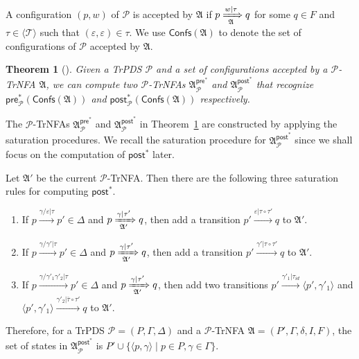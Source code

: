 \documentclass[preprint,12pt]{elsarticle}
\newtheorem{theorem}{Theorem}
\newcommand\Pp{{\mathcal{P} }}
\newcommand\confs{{\mathsf{Confs} }}
\newcommand\pre{{\mathsf{pre} }}
\newcommand\post{{\mathsf{post} }}
\newcommand\Aut{{\mathfrak{A} }}
\newcommand\TranSet{{\mathscr{T} }}
\newcommand{\TrPDS}{\textsf{TrPDS}}
\newcommand{\TrNFA}{\textsf{TrNFA}}
\begin{document}
A configuration $(p, w)$ of $\Pp$ is accepted by $\Aut$ if $p \xRightarrow[\Aut]{w | \tau} q$ for some $q \in F$ and $\tau \in \langle \TranSet \rangle$ such that $(\varepsilon, \varepsilon) \in \tau$.
We use $\confs(\Aut)$ to denote the set of configurations of $\Pp$ accepted by $\Aut$.


\begin{theorem}[\cite{Song18}]\label{thm-trpds}
	Given  a {\TrPDS} $\Pp$ and a set of configurations accepted by a $\Pp$-{\TrNFA} $\Aut$, we can compute two $\Pp$-{\TrNFA}s $\Aut^{\pre^*}_{\Pp}$  and $\Aut^{\post^*}_{\Pp}$ that recognize $\pre^*_\Pp(\confs(\Aut))$ and $\post^*_\Pp(\confs(\Aut))$ respectively.
\end{theorem}

The $\Pp$-{\TrNFA}s $\Aut^{\pre^*}_{\Pp}$ and $\Aut^{\post^*}_{\Pp}$ in Theorem~\ref{thm-trpds} are constructed by applying the saturation procedures. We recall the saturation procedure for $\Aut^{\post^*}_{\Pp}$ since we shall focus on the computation of $\post^*$  later.

Let $\Aut'$ be the current $\Pp$-\TrNFA. Then there are the following three saturation rules for computing $\post^*$. 

\smallskip
\fbox
{
\begin{minipage}{0.9\textwidth}
\begin{enumerate}
    \item If $p \xrightarrow{\gamma/\varepsilon | \tau} p' \in \Delta$ and $p \xRightarrow[\Aut']{\gamma | \tau' } q$, then add a transition $p' \xrightarrow{\varepsilon | \tau \circ \tau'} q$ to $\Aut'$. 
%
    \item If $p \xrightarrow{\gamma/\gamma' | \tau} p' \in \Delta$ and $p \xRightarrow[\Aut']{\gamma | \tau' } q$, then add a transition $p' \xrightarrow{\gamma' | \tau \circ \tau'} q$ to $\Aut'$. 
%
    \item If $p \xrightarrow{\gamma/\gamma'_1 \gamma'_2 | \tau} p' \in \Delta$ and $p \xRightarrow[\Aut']{\gamma | \tau' } q$, then add two transitions $p' \xrightarrow{\gamma'_1 | \tau_{id}} \langle p', \gamma'_1\rangle$ and $\langle p', \gamma'_1\rangle \xrightarrow{\gamma'_2 | \overline{\tau} \circ \tau' } q$ to $\Aut'$.  
\end{enumerate}
\end{minipage}
}

\smallskip

Therefore, for a {\TrPDS} $\Pp=(P,\Gamma,\Delta)$ and a $\Pp$-{\TrNFA} $\Aut = (P', \Gamma, \delta, I, F)$, the set of states in $\Aut^{\post^*}_\Pp$ is $P' \cup \{\langle p, \gamma \rangle \mid p \in P, \gamma \in \Gamma \}$.
\end{document}
